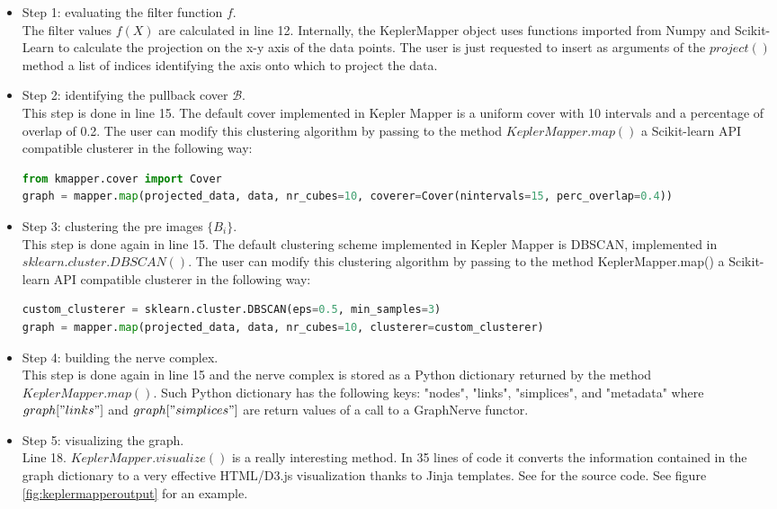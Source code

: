 \begin{itemize}
	\item Step 1: evaluating the filter function $f$. \\The filter values $f(X)$ are calculated in line 12. Internally, the KeplerMapper object uses functions imported from Numpy and Scikit-Learn to calculate the projection on the x-y axis of the data points. The user is just requested to insert as arguments of the $project()$ method a list of indices identifying the axis onto which to project the data.
	\item Step 2: identifying the pullback cover $\mathcal B$. \\This step is done in line 15. The default cover implemented in Kepler Mapper is a uniform cover with 10 intervals and a percentage of overlap of 0.2. The user can modify this clustering algorithm by passing to the method $KeplerMapper.map()$ a Scikit-learn API compatible clusterer in the following way:
	\begin{lstlisting}[language=Python]
from kmapper.cover import Cover
graph = mapper.map(projected_data, data, nr_cubes=10, coverer=Cover(nintervals=15, perc_overlap=0.4))\end{lstlisting}
	\item Step 3: clustering the pre images $\{B_i\}$.\\This step is done again in line 15. The default clustering scheme implemented in Kepler Mapper is DBSCAN, implemented in $sklearn.cluster.DBSCAN()$. The user can modify this clustering algorithm by passing to the method KeplerMapper.map() a Scikit-learn API compatible clusterer in the following way:
	\begin{lstlisting}[language=Python]
custom_clusterer = sklearn.cluster.DBSCAN(eps=0.5, min_samples=3)
graph = mapper.map(projected_data, data, nr_cubes=10, clusterer=custom_clusterer)\end{lstlisting}
	\item Step 4: building the nerve complex. \\This step is done again in line 15 and the nerve complex is stored as a Python dictionary returned by the method $KeplerMapper.map()$. Such Python dictionary has the following keys: "nodes", "links", "simplices", and "metadata" where $graph["links"]$ and $graph["simplices"]$ are return values of a call to a GraphNerve functor.
	\item Step 5: visualizing the graph.\\Line 18. $KeplerMapper.visualize()$ is a really interesting method. In 35 lines of code it converts the information contained in the graph dictionary to a very effective HTML/D3.js visualization thanks to Jinja templates. See \cite{KMapper} for the source code. See figure \ref{fig:keplermapperoutput} for an example.
\end{itemize}
